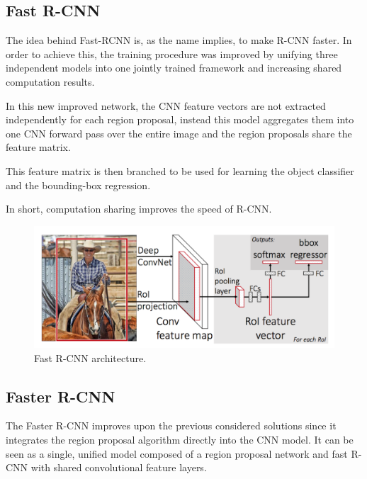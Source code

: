     \subsection{Fast R-CNN}

    \par The idea behind Fast-RCNN \cite{girshick2015fast} is, as the name implies, to make  R-CNN faster. In order to achieve this, the training procedure was improved by unifying three independent models into one jointly trained framework and increasing shared computation results.
    \par In this new improved network, the CNN feature vectors are not extracted independently for each region proposal, instead this model aggregates them into one CNN forward pass over the entire image and the region proposals share the feature matrix.
    \par This feature matrix is then branched to be used for learning the object classifier and the bounding-box regression.
    \par In short, computation sharing improves the speed of R-CNN. \cite{weng2017detection3}

    \begin{figure}[htb]
        \centering
        \includegraphics[scale = 0.15]{Sections/2StateOfTheArt/2_images/fast-RCNN.png}
        \caption{Fast R-CNN architecture. \cite{weng2017detection3}} 
    \end{figure}

    
    \subsection{Faster R-CNN}
    \label{sec:fasterrcnn}

    \par The Faster R-CNN \cite{ren2015faster} improves upon the previous considered solutions since it integrates the region proposal algorithm directly into the CNN model. It can be seen as a single, unified model composed of a region proposal network and fast R-CNN with shared convolutional feature layers. \cite{weng2017detection3}

